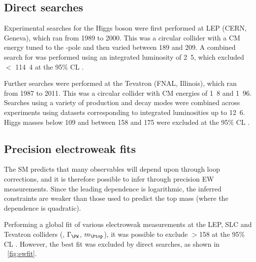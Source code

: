 \subsection{Direct searches}

Experimental searches for the Higgs boson were first performed at LEP (CERN, Geneva), which ran from 1989 to 2000. This was a circular \epluseminus collider with a \ac{CM} 
energy tuned to the \PZ-pole and then varied between 189 and \unit{209}{\GeV}. A combined 
search for \ZH was performed using an integrated luminosity of \unit{2.5}{\invfb}, which 
excluded \mH $<$ \unit{114.4}{\GeV} at the 95\% \ac{CL} \cite{LEP:2003}.

Further searches were performed at the Tevatron (FNAL, Illinois), which ran from 1987
to 2011. This was a circular \ppbar collider with \ac{CM} energies of \unit{1.8}{\TeV}
and \unit{1.96}{\TeV}. Searches using a variety of production and decay modes were
combined across experiments using datasets corresponding to integrated luminosities up to
\unit{12.6}{\invfb}. Higgs masses below \unit{109}{\GeV} and between 158 and 
\unit{175}{\GeV} were excluded at the 95\% \ac{CL} \cite{Tevatron:2010}.




\subsection{Precision electroweak fits}

The \ac{SM} predicts that many observables will depend upon \mH through loop corrections,
and it is therefore possible to infer \mH through precision \ac{EW} measurements. Since 
the leading \mH dependence is logarithmic, the inferred constraints are weaker than those
used to predict the top mass (where the dependence is quadratic).

Performing a global fit of various electroweak measurements at the \ac{LEP}, SLC and
Tevatron colliders (\eg \mW, $\Gamma_{\PW}$, $m_{\Ptop}$), it was possible to exclude 
\mH$>$\unit{158}{\GeV} at the 95\% \ac{CL} \cite{Gfitter:2008}. However, the best fit \mH
was excluded by direct searches, as shown in \Figure~\ref{fig:ewfit}.


